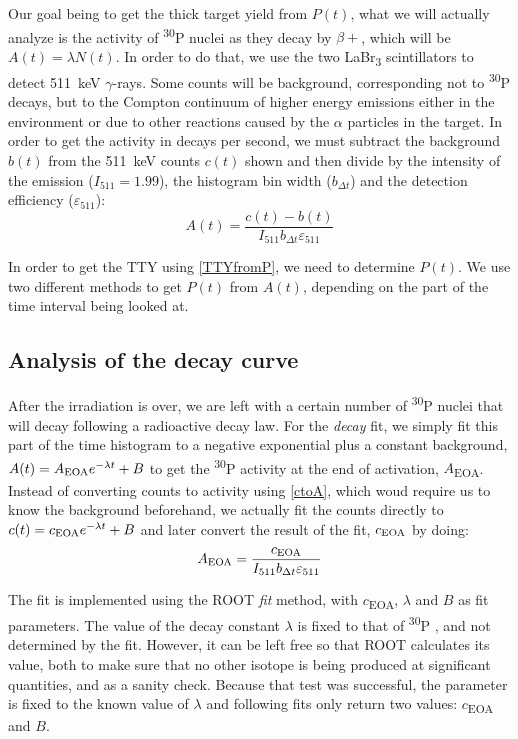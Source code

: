\documentclass[a4paper,12pt]{report}
\newcommand{\Piso}{\textsuperscript{30}P }
\begin{document}
Our goal being to get the thick target yield from $P(t)$, what we will actually analyze is the activity of \Piso nuclei as they decay by $\beta +$, which will be $A(t) = \lambda N(t)$.
In order to do that, we use the two LaBr\textsubscript{3} scintillators to detect \qty{511}{\keV} $\gamma$-rays.
Some counts will be background, corresponding not to \Piso decays, but to the Compton continuum of higher energy emissions either in the environment or due to other reactions caused by the $\alpha$ particles in the target.
In order to get the activity in decays per second, we must subtract the background $b(t)$ from the \qty{511}{\keV} counts $c(t)$ shown and then divide by the intensity of the emission ($I_{511}=\num{1.99}$), the histogram bin width ($b_{\Delta t}$) and the detection efficiency ($\varepsilon_{511}$):
\begin{equation}
	A(t) = \frac{c(t) - b(t)}{I_{511} b_{\Delta t} \varepsilon_{511}}
	\label{ctoA}
\end{equation}

In order to get the TTY using \ref{TTYfromP}, we need to determine $P(t)$.
We use two different methods to get $P(t)$ from $A(t)$, depending on the part of the time interval being looked at.

\subsection{Analysis of the decay curve}
After the irradiation is over, we are left with a certain number of \Piso nuclei that will decay following a radioactive decay law.
For the \textit{decay} fit, we simply fit this part of the time histogram to a negative exponential plus a constant background, $A(t) = A\textsubscript{EOA} e^{-\lambda t} + B$ to get the \Piso activity at the end of activation, $A$\textsubscript{EOA}.
Instead of converting counts to activity using \ref{ctoA}, which woud require us to know the background beforehand, we actually fit the counts directly to $c(t) = c\textsubscript{EOA} e^{-\lambda t} + B$ and later convert the result of the fit, $c\textsubscript{EOA}$ by doing:
\begin{equation}
	A\textsubscript{EOA} = \frac{c\textsubscript{EOA}}{I_{511} b_{\Delta t} \varepsilon_{511}}
\end{equation}

The fit is implemented using the ROOT \textit{fit} method, with $c$\textsubscript{EOA}, $\lambda$ and $B$ as fit parameters.
The value of the decay constant $\lambda$ is fixed to that of \Piso, and not determined by the fit.
However, it can be left free so that ROOT calculates its value, both to make sure that no other isotope is being produced at significant quantities, and as a sanity check.
Because that test was successful, the parameter is fixed to the known value of $\lambda$ and following fits only return two values: $c$\textsubscript{EOA} and $B$.
\\
\end{document}
